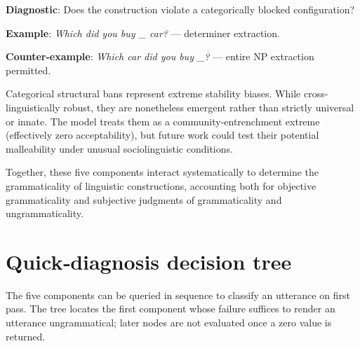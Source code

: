 \documentclass[12pt]{article}
\begin{document}
\begin{tcolorbox}[colback=lsLightBlue!30]
\textbf{Diagnostic}: Does the construction violate a categorically blocked configuration?

\textbf{Example}: \textit{\*Which did you buy \_ car?} — determiner extraction.

\textbf{Counter-example}: \textit{Which car did you buy \_?} — entire NP extraction permitted.
\end{tcolorbox}

Categorical structural bans represent extreme stability biases. While cross-linguistically robust, they are nonetheless emergent rather than strictly universal or innate. The model treats them as a community-entrenchment extreme (effectively zero acceptability), but future work could test their potential malleability under unusual sociolinguistic conditions.

Together, these five components interact systematically to determine the grammaticality of linguistic constructions, accounting both for objective grammaticality and subjective judgments of grammaticality and ungrammaticality.


\section{Quick‑diagnosis decision tree}

The five components can be queried in sequence to classify an utterance on first pass. The tree locates the first component whose failure suffices to render an utterance ungrammatical; later nodes are not evaluated once a zero value is returned.
\end{document}
